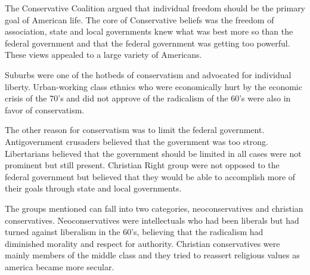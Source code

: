 The Conservative Coalition argued that individual freedom should be the primary goal of American life.
The core of Conservative beliefs was the freedom of association, state and local governments knew what was best more so than the federal government and that the federal government was getting too powerful.
These views appealed to a large variety of Americans.

Suburbs were one of the hotbeds of conservatism and advocated for individual liberty.
Urban-working class ethnics who were economically hurt by the economic crisis of the 70's and did not approve of the radicalism of the 60's were also in favor of conservatism.

The other reason for conservatism was to limit the federal government.
Antigovernment crusaders believed that the government was too strong.
Libertarians believed that the government should be limited in all cases were not prominent but still present.
Christian Right group were not opposed to the federal government but believed that they would be able to accomplish more of their goals through state and local governments.

The groups mentioned can fall into two categories, neoconservatives and christian conservatives.
Neoconservatives were intellectuals who had been liberals but had turned against liberalism in the 60's, believing that the radicalism had diminished morality and respect for authority.
Christian conservatives were mainly members of the middle class and they tried to reassert  religious values as america became more secular.